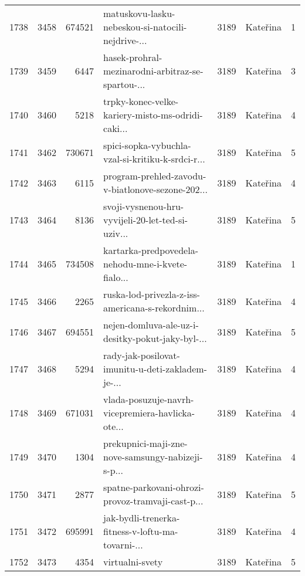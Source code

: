 \begin{tabular}{lrrlrlr}
1738 &       3458 &   674521 &  matuskovu-lasku-nebeskou-si-natocili-nejdrive-... &     3189 &                     Kateřina &               1 \\
1739 &       3459 &     6447 &  hasek-prohral-mezinarodni-arbitraz-se-spartou-... &     3189 &                     Kateřina &               3 \\
1740 &       3460 &     5218 &  trpky-konec-velke-kariery-misto-ms-odridi-caki... &     3189 &                     Kateřina &               4 \\
1741 &       3462 &   730671 &  spici-sopka-vybuchla-vzal-si-kritiku-k-srdci-r... &     3189 &                     Kateřina &               5 \\
1742 &       3463 &     6115 &  program-prehled-zavodu-v-biatlonove-sezone-202... &     3189 &                     Kateřina &               4 \\
1743 &       3464 &     8136 &  svoji-vysnenou-hru-vyvijeli-20-let-ted-si-uziv... &     3189 &                     Kateřina &               5 \\
1744 &       3465 &   734508 &  kartarka-predpovedela-nehodu-mne-i-kvete-fialo... &     3189 &                     Kateřina &               1 \\
1745 &       3466 &     2265 &  ruska-lod-privezla-z-iss-americana-s-rekordnim... &     3189 &                     Kateřina &               4 \\
1746 &       3467 &   694551 &  nejen-domluva-ale-uz-i-desitky-pokut-jaky-byl-... &     3189 &                     Kateřina &               5 \\
1747 &       3468 &     5294 &  rady-jak-posilovat-imunitu-u-deti-zakladem-je-... &     3189 &                     Kateřina &               4 \\
1748 &       3469 &   671031 &  vlada-posuzuje-navrh-vicepremiera-havlicka-ote... &     3189 &                     Kateřina &               4 \\
1749 &       3470 &     1304 &  prekupnici-maji-zne-nove-samsungy-nabizeji-s-p... &     3189 &                     Kateřina &               4 \\
1750 &       3471 &     2877 &  spatne-parkovani-ohrozi-provoz-tramvaji-cast-p... &     3189 &                     Kateřina &               5 \\
1751 &       3472 &   695991 &  jak-bydli-trenerka-fitness-v-loftu-ma-tovarni-... &     3189 &                     Kateřina &               4 \\
1752 &       3473 &     4354 &                                    virtualni-svety &     3189 &                     Kateřina &               5 \\

\end{tabular}
